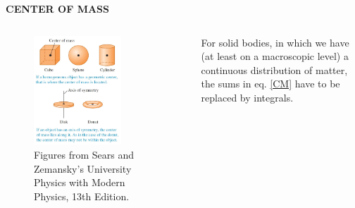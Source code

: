 \documentclass[]{beamer}
\begin{document}
\begin{frame}
    \textbf{CENTER OF MASS}
     \vspace{7mm}

     
      \begin{columns}[c]
        \column{2in}  %
       
           
     \begin{figure}[h!]  
        \includegraphics[width=0.7\textwidth]{images/9.jpg}
        \caption{ {\tiny Figures from Sears and Zemansky's University Physics 
        with Modern Physics, 13th Edition.} }
      \end{figure}

    
          
        \column{2in}
     
    
  

    
        For solid bodies, in which we have (at least on a macroscopic level) a continuous
        distribution of matter, the sums in eq. \ref{CM} have to be replaced by integrals.

    
\end{columns}




     \end{frame}





\end{document}
